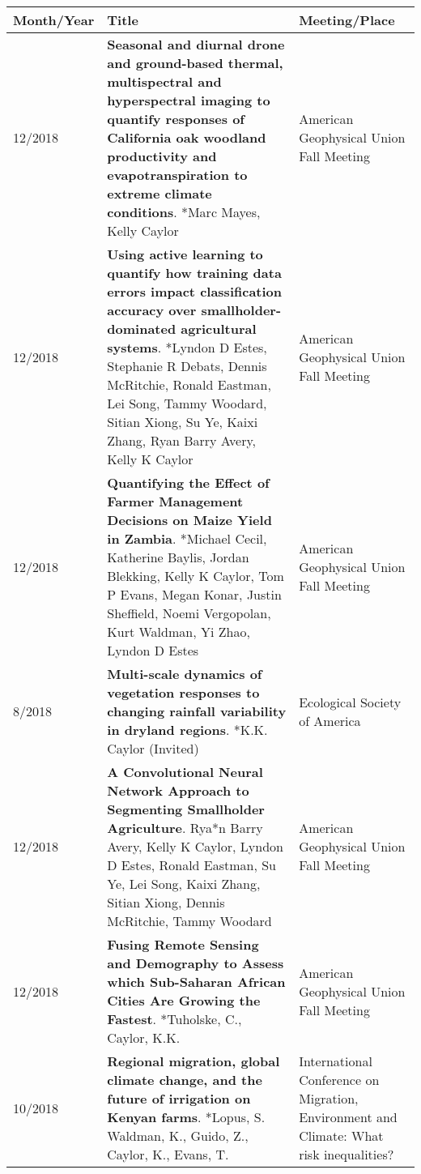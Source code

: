 
\begin{longtable}{lp{10.0cm}p{4.5cm}}
Month/Year & Title & Meeting/Place\\
\hline 
\endhead
 
12/2018 & {\bf Seasonal and diurnal drone and ground-based thermal, multispectral and hyperspectral imaging to quantify responses of California oak woodland productivity and evapotranspiration to extreme climate conditions}. *Marc Mayes, Kelly Caylor  & American Geophysical Union Fall Meeting \\
  
12/2018 & {\bf Using active learning to quantify how training data errors impact classification accuracy over smallholder-dominated agricultural systems}. *Lyndon D Estes, Stephanie R Debats, Dennis McRitchie, Ronald Eastman, Lei Song, Tammy Woodard, Sitian Xiong, Su Ye, Kaixi Zhang, Ryan Barry Avery, Kelly K Caylor  & American Geophysical Union Fall Meeting \\
  
12/2018 & {\bf Quantifying the Effect of Farmer Management Decisions on Maize Yield in Zambia}. *Michael Cecil, Katherine Baylis, Jordan Blekking, Kelly K Caylor, Tom P Evans, Megan Konar, Justin Sheffield, Noemi Vergopolan, Kurt Waldman, Yi Zhao, Lyndon D Estes  & American Geophysical Union Fall Meeting \\
  
8/2018 & {\bf Multi-scale dynamics of vegetation responses to changing rainfall variability in dryland regions}. *K.K. Caylor  (Invited)  & Ecological Society of America \\
  
12/2018 & {\bf A Convolutional Neural Network Approach to Segmenting Smallholder Agriculture}. Rya*n Barry Avery, Kelly K Caylor, Lyndon D Estes, Ronald Eastman, Su Ye, Lei Song, Kaixi Zhang, Sitian Xiong, Dennis McRitchie, Tammy Woodard  & American Geophysical Union Fall Meeting \\
  
12/2018 & {\bf Fusing Remote Sensing and Demography to Assess which Sub-Saharan African Cities Are Growing the Fastest}. *Tuholske, C., Caylor, K.K.  & American Geophysical Union Fall Meeting \\
  
10/2018 & {\bf Regional migration, global climate change,
and the future of irrigation on Kenyan farms}. *Lopus, S. Waldman, K., Guido, Z., Caylor, K., Evans, T.  & International Conference on Migration, Environment and Climate: What risk inequalities?  \\
  

\end{longtable}
